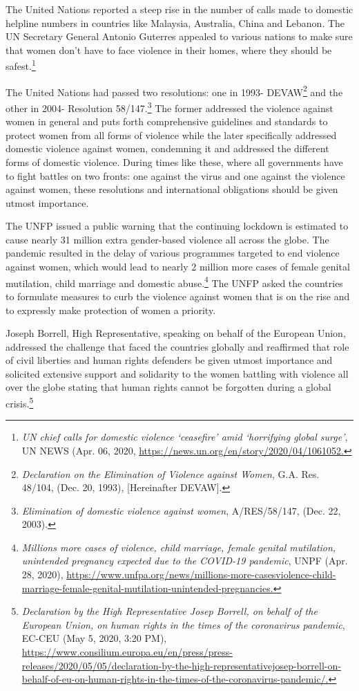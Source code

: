 \begin{multicols}{2}
\noi
The United Nations reported a steep rise in the number of calls made to domestic helpline
numbers in countries like Malaysia, Australia, China and Lebanon. The UN Secretary
General Antonio Guterres appealed to various nations to make sure that women don’t have to
face violence in their homes, where they should be safest.\footnote{\textit{UN chief calls for domestic violence ‘ceasefire’ amid ‘horrifying global surge’}, UN NEWS (Apr. 06, 2020,
\url{https://news.un.org/en/story/2020/04/1061052.}}

\noi
The United Nations had passed two resolutions: one in 1993- DEVAW\footnote{\textit{Declaration on the Elimination of Violence against Women}, G.A. Res. 48/104, (Dec. 20, 1993), [Hereinafter
DEVAW].} and the other in
2004- Resolution 58/147.\footnote{\textit{Elimination of domestic violence against women}, A/RES/58/147, (Dec. 22, 2003).} The former addressed the violence against women in general and
puts forth comprehensive guidelines and standards to protect women from all forms of
violence while the later specifically addressed domestic violence against women,
condemning it and addressed the different forms of domestic violence. During times like
these, where all governments have to fight battles on two fronts: one against the virus and one
against the violence against women, these resolutions and international obligations should be
given utmost importance.



\noi
The UNFP issued a public warning that the continuing lockdown is estimated to cause nearly
31 million extra gender-based violence all across the globe. The pandemic resulted in the
delay of various programmes targeted to end violence against women, which would lead to
nearly 2 million more cases of female genital mutilation, child marriage and domestic
abuse.\footnote{\textit{Millions more cases of violence, child marriage, female genital mutilation, unintended pregnancy expected
due to the COVID-19 pandemic}, UNPF (Apr. 28, 2020), \url{https://www.unfpa.org/news/millions-more-casesviolence-child-marriage-female-genital-mutilation-unintended-pregnancies.}} The UNFP asked the countries to formulate measures to curb the violence against
women that is on the rise and to expressly make protection of women a priority.


\noi
Joseph Borrell, High Representative, speaking on behalf of the European Union, addressed
the challenge that faced the countries globally and reaffirmed that role of civil liberties and
human rights defenders be given utmost importance and solicited extensive support and
solidarity to the women battling with violence all over the globe stating that human rights
cannot be forgotten during a global crisis.\footnote{\textit{Declaration by the High Representative Josep Borrell, on behalf of the European Union, on human rights in
the times of the coronavirus pandemic}, EC-CEU (May 5, 2020, 3:20 PM),
\url{https://www.consilium.europa.eu/en/press/press-releases/2020/05/05/declaration-by-the-high-representativejosep-borrell-on-behalf-of-eu-on-human-rights-in-the-times-of-the-coronavirus-pandemic/.}}


\end{multicols}
